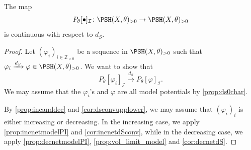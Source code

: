 \begin{theorem}\label{thm:contPI}
    The map
    \[
        P_{\theta}[\bullet]_{\mathcal{I}}\colon \PSH(X,\theta)_{>0}\rightarrow \PSH(X,\theta)_{>0}
    \]
    is continuous with respect to $d_S$.
   \end{theorem}
   \begin{proof}
       Let $(\varphi_i)_{i\in \mathbb{Z}_{>0}}$ be a sequence in $\PSH(X,\theta)_{>0}$ such that $\varphi_i\xrightarrow{d_S}\varphi\in \PSH(X,\theta)_{>0}$. We want to show that
       \begin{equation}
           P_{\theta}[\varphi_i]_{\mathcal{I}}\xrightarrow{d_S}P_{\theta}[\varphi]_{\mathcal{I}}.
       \end{equation}
       We may assume that the $\varphi_i$'s and $\varphi$ are all model potentials by \cref{prop:ds0char}.


       By \cref{prop:incanddec} and \cref{cor:dsconvupplower}, we may assume that $(\varphi_i)_i$ is either increasing or decreasing.
       In the increasing case, we apply \cref{prop:incnetmodelPI} and \cref{cor:incnetdSconv}, while in the decreasing case, we apply \cref{prop:decnetmodelPI}, \cref{prop:vol_limit_model} and \cref{cor:decnetdS}.
    \end{proof}

